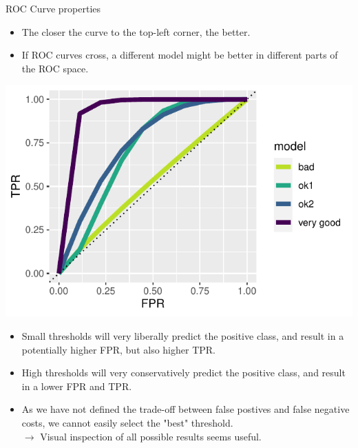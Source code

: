 
\begin{vbframe}{ROC Curve properties}

\begin{minipage}[c]{0.5\textwidth}
  \begin{itemize}
    \item The closer the curve to the top-left corner, the better.
    \item If ROC curves cross, a different model might be better in different 
    parts of the ROC space.
\end{itemize}
\end{minipage}%
\begin{minipage}[c]{0.5\textwidth}
  \centering 
  \includegraphics[width=\textwidth]{figure/eval_mclass_roc_sp_12}
\end{minipage}

\lz

\begin{itemize}
  \item Small thresholds will very liberally predict the positive class, and 
  result in a potentially higher FPR, but also higher TPR.
  \item High thresholds will very conservatively predict the positive class, 
  and result in a lower FPR and TPR.
  \item As we have not defined the trade-off between false postives and false 
  negative costs, we cannot easily select the "best" threshold. \\
  $\rightarrow$ Visual inspection of all possible results seems useful.
\end{itemize}


\end{vbframe}
